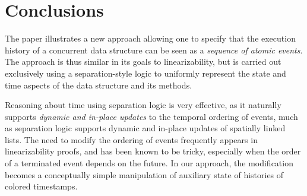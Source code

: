 \section{Conclusions}
\label{sec:conclusions}

The paper illustrates a new approach allowing one to specify that the
execution history of a concurrent data structure can be seen as a
\emph{sequence of atomic events}. The approach is thus similar in its
goals to linearizability, but is carried out exclusively using a
separation-style logic to uniformly represent the state and time
aspects of the data structure and its methods.

Reasoning about time using separation logic is very effective, as it
naturally supports \emph{dynamic and in-place updates} to the temporal
ordering of events, much as separation logic supports dynamic and
in-place updates of spatially linked lists. The need to modify the
ordering of events frequently appears in linearizability proofs, and
has been known to be tricky, especially when the order of a terminated
event depends on the future. In our approach, the modification becomes
a conceptually simple manipulation of auxiliary state of histories of
colored timestamps.




